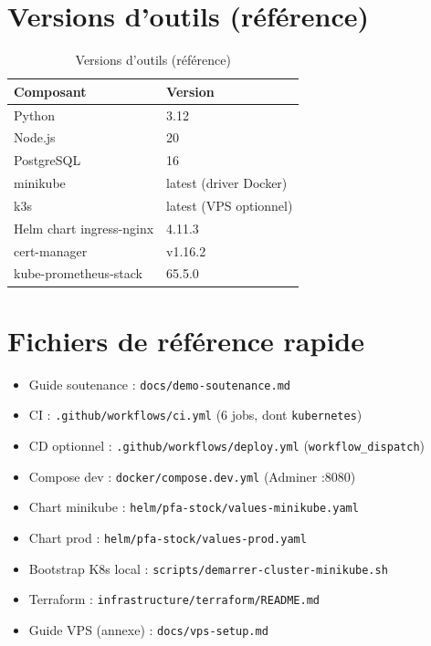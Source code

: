 \section{Versions d'outils (référence)}

\begin{table}[htbp]
  \centering
  \caption{Versions d'outils (référence)}
  \label{tab:versions}
  \begin{tabular}{@{}ll@{}}
    \toprule
    \textbf{Composant} & \textbf{Version} \\
    \midrule
    Python & 3.12 \\
    Node.js & 20 \\
    PostgreSQL & 16 \\
    minikube & latest (driver Docker) \\
    k3s & latest (VPS optionnel) \\
    Helm chart ingress-nginx & 4.11.3 \\
    cert-manager & v1.16.2 \\
    kube-prometheus-stack & 65.5.0 \\
    \bottomrule
  \end{tabular}
\end{table}

\section{Fichiers de référence rapide}

\begin{itemize}
  \item Guide soutenance : \texttt{docs/demo-soutenance.md}
  \item CI : \texttt{.github/workflows/ci.yml} (6 jobs, dont \texttt{kubernetes})
  \item CD optionnel : \texttt{.github/workflows/deploy.yml} (\texttt{workflow\_dispatch})
  \item Compose dev : \texttt{docker/compose.dev.yml} (Adminer :8080)
  \item Chart minikube : \texttt{helm/pfa-stock/values-minikube.yaml}
  \item Chart prod : \texttt{helm/pfa-stock/values-prod.yaml}
  \item Bootstrap K8s local : \texttt{scripts/demarrer-cluster-minikube.sh}
  \item Terraform : \texttt{infrastructure/terraform/README.md}
  \item Guide VPS (annexe) : \texttt{docs/vps-setup.md}
\end{itemize}
